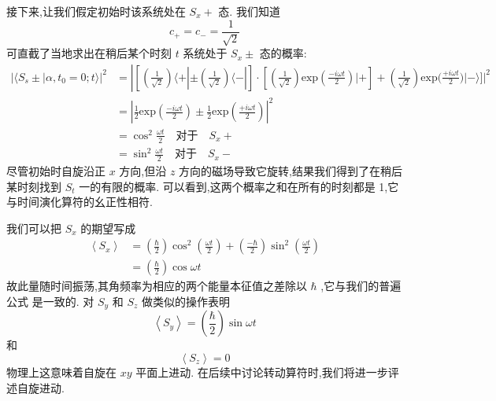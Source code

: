 接下来,让我们假定初始时该系统处在 ${S}_{x} +$ 态. 我们知道
\begin{equation}
	{c}_{ + } = {c}_{ - } = \frac{1}{\sqrt{2}}
\end{equation}
可直截了当地求出在稍后某个时刻 $t$ 系统处于 ${S}_{x} \pm$ 态的概率:
\begin{equation}
	\begin{aligned}
		|\langle S_{s}\pm|\alpha,t_{0}=0;t\rangle|^{2}& = \left|\left[\left(\frac{1}{\sqrt{2}}\right)\langle+|\pm\left(\frac{1}{\sqrt{2}}\right)\langle-|\right.\right]\cdot\left[\left(\frac{1}{\sqrt{2}}\right)\mathrm{exp}\left(\frac{- i \omega t}{2}\right)|+\right] +\left(\frac1{\sqrt{2}}\right)\mathrm{exp}\biggl(\frac{+i\omega t}2\biggr)|-\rangle\biggr]\biggr|^2 \\
		&= \left| \frac{1}{2}\mathrm{exp} \left(\frac{- i \omega t}{2}\right)\pm\frac{1}{2}\mathrm{exp} \left(\frac{+ i \omega t}{2}\right) \right|^{2} \\
		&=\cos^{2}\frac{\omega t}{2}\quad\text{对于}\quad S_{x}+\\
		&=\sin^{2}\frac{\omega t}{2}\quad\text{对于}\quad S_{x}-
	\end{aligned}
\end{equation}
尽管初始时自旋沿正 $x$ 方向,但沿 $z$ 方向的磁场导致它旋转,结果我们得到了在稍后某时刻找到 ${S}_{t}$ 一的有限的概率. 可以看到,这两个概率之和在所有的时刻都是 1,它与时间演化算符的幺正性相符.

我们可以把 ${S}_{x}$ 的期望写成
\begin{equation}
	\begin{aligned}
		\left\langle {S}_{x}\right\rangle &= \left( \frac{\hbar }{2}\right) {\cos }^{2}\left( \frac{\omega t}{2}\right) + \left( \frac{-\hbar }{2}\right) {\sin }^{2}\left( \frac{\omega t}{2}\right)\\
		&= \left( \frac{\hbar }{2}\right) \cos {\omega t}
	\end{aligned}
\end{equation}
故此量随时间振荡,其角频率为相应的两个能量本征值之差除以 $\hbar$ ,它与我们的普遍公式 是一致的. 对 ${S}_{y}$ 和 ${S}_{z}$ 做类似的操作表明
\begin{equation}
	\left\langle {S}_{y}\right\rangle = \left( \frac{\hbar }{2}\right) \sin {\omega t}
\end{equation}
和
\begin{equation}
	\left\langle {S}_{z}\right\rangle = 0
\end{equation}
物理上这意味着自旋在 ${xy}$ 平面上进动. 在后续中讨论转动算符时,我们将进一步评述自旋进动.

